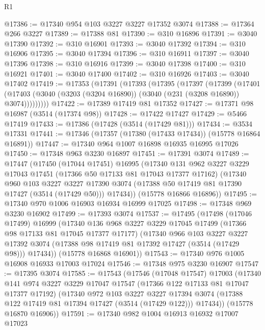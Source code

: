 \begin{lexlean}{R1}
\begin{coremodule}
@17386 := @17340 @954 @103 @3227 @3227 @17352 @3074
@17388 := @17364 @266 @3227
@17389 := @17388 @81
@17390 := @310 @16896
@17391 := @3040 @17390
@17392 := @310 @16901
@17393 := @3040 @17392
@17394 := @310 @16906
@17395 := @3040 @17394
@17396 := @310 @16911
@17397 := @3040 @17396
@17398 := @310 @16916
@17399 := @3040 @17398
@17400 := @310 @16921
@17401 := @3040 @17400
@17402 := @310 @16926
@17403 := @3040 @17402
@17419 := @17353
    (@17391
      (@17393
        (@17395
          (@17397
            (@17399
              (@17401
                (@17403 (@3040 (@3203 (@3204 @16890)) (@3040 (@231 (@3208 @16890)) @3074)))))))))
@17422 := @17389 @17419 @81 @17352
@17427 := @17371 @98 @16987 (@3514 (@17374 @98))
@17428 := @17422 @17427
@17429 := @5466 @17419
@17433 := @17386 (@17428 (@3514 (@17429 @81)))
@17434 := @3534 @17331
@17441 := @17346 (@17357 (@17380 (@17433 @17434)) (@15778 @16864 @16891))
@17447 := @17340 @964 @1007 @16898 @16935 @16995 @17026
@17450 := @17348 @963 @3230 @16897
@17451 := @17391 @3074
@17489 := @17447
    (@17450
      (@17044 @17451)
      @16995
      (@17340
        @131
        @962
        @3227
        @3229
        @17043
        @17451
        (@17366 @50 @17133 @81 @17043 @17377 @17162)
        (@17340
          @960
          @103
          @3227
          @3227
          @17390
          @3074
          (@17388 @50 @17419 @81 @17390 @17427 (@3514 (@17429 @50)))
          @17434))
      (@15778 @16866 @16896))
@17495 := @17340 @970 @1006 @16903 @16934 @16999 @17025
@17498 := @17348 @969 @3230 @16902
@17499 := @17393 @3074
@17537 := @17495
    (@17498
      (@17046 @17499)
      @16999
      (@17340
        @136
        @968
        @3227
        @3229
        @17045
        @17499
        (@17366 @98 @17133 @81 @17045 @17377 @17177)
        (@17340
          @966
          @103
          @3227
          @3227
          @17392
          @3074
          (@17388 @98 @17419 @81 @17392 @17427 (@3514 (@17429 @98)))
          @17434))
      (@15778 @16868 @16901))
@17543 := @17340 @976 @1005 @16908 @16933 @17003 @17024
@17546 := @17348 @975 @3230 @16907
@17547 := @17395 @3074
@17585 := @17543
    (@17546
      (@17048 @17547)
      @17003
      (@17340
        @141
        @974
        @3227
        @3229
        @17047
        @17547
        (@17366 @122 @17133 @81 @17047 @17377 @17192)
        (@17340
          @972
          @103
          @3227
          @3227
          @17394
          @3074
          (@17388 @122 @17419 @81 @17394 @17427 (@3514 (@17429 @122)))
          @17434))
      (@15778 @16870 @16906))
@17591 := @17340 @982 @1004 @16913 @16932 @17007 @17023

\end{coremodule}
\end{lexlean}
